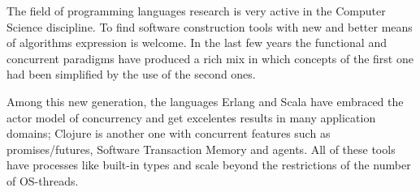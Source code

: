 
The field of programming languages research is very active in the Computer Science discipline. To find software construction tools with new and better means of algorithms expression is welcome. In the last few years the functional and concurrent paradigms have produced a rich mix in which concepts of the first one had been simplified by the use of the second ones.

Among this new generation, the languages Erlang and Scala have embraced the actor model of concurrency and get excelentes results in many application domains; Clojure is another one with concurrent features such as promises/futures, Software Transaction Memory and agents. All of these tools have processes like built-in types and scale beyond the restrictions of the number of OS-threads.
